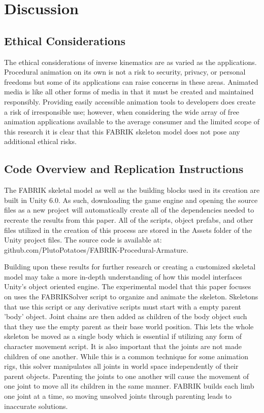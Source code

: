 \documentclass[10pt,twocolumn]{article}
\begin{document}
\section{Discussion}

\subsection{Ethical Considerations}

The ethical considerations of inverse kinematics are as varied as the applications. Procedural animation on its own is not a risk to security, privacy, or personal freedoms but some of its applications can raise concerns in these areas. Animated media is like all other forms of media in that it must be created and maintained responsibly. Providing easily accessible animation tools to developers does create a risk of irresponsible use; however, when considering the wide array of free animation applications available to the average consumer and the limited scope of this research it is clear that this FABRIK skeleton model does not pose any additional ethical risks.

\subsection{Code Overview and Replication Instructions}

The FABRIK skeletal model as well as the building blocks used in its creation are built in Unity 6.0. As such, downloading the game engine and opening the source files as a new project will automatically create all of the dependencies needed to recreate the results from this paper. All of the scripts, object prefabs, and other files utilized in the creation of this process are stored in the Assets folder of the Unity project files. The source code is available at: github.com/PlutoPotatoes/FABRIK-Procedural-Armature.

Building upon these results for further research or creating a customized skeletal model may take a more in-depth understanding of how this model interfaces Unity's object oriented engine. The experimental model that this paper focuses on uses the FABRIKSolver script to organize and animate the skeleton. Skeletons that use this script or any derivative scripts must start with a empty parent 'body' object. Joint chains are then added as children of the body object such that they use the empty parent as their base world position. This lets the whole skeleton be moved as a single body which is essential if utilizing any form of character movement script. It is also important that the joints are not made children of one another. While this is a common technique for some animation rigs, this solver manipulates all joints in world space independently of their parent objects. Parenting the joints to one another will cause the movement of one joint to move all its children in the same manner. FABRIK builds each limb one joint at a time, so moving unsolved joints through parenting leads to inaccurate solutions. 
\end{document}

